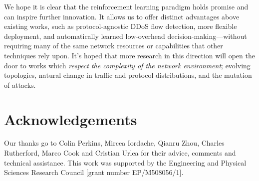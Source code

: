 \documentclass[10pt, times, comsoc]{IEEEtran}
\begin{document}
We hope it is clear that the reinforcement learning paradigm holds promise and can inspire further innovation.
It allows us to offer distinct advantages above existing works, such as protocol-agnostic DDoS flow detection, more flexible deployment, and automatically learned low-overhead decision-making---without requiring many of the same network resources or capabilities that other techniques rely upon.
It's hoped that more research in this direction will open the door to works which \emph{respect the complexity of the network environment}; evolving topologies, natural change in traffic and protocol distributions, and the mutation of attacks.

\section*{Acknowledgements}
Our thanks go to Colin Perkins, Mircea Iordache, Qianru Zhou, Charles Rutherford, Marco Cook and Cristian Urlea for their advice, comments and technical assistance.
This work was supported by the Engineering and Physical Sciences Research Council [grant number EP/M508056/1].
\end{document}
